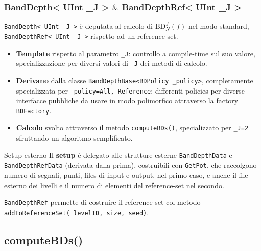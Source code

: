 \documentclass[9pt]{beamer}
\begin{document}
\begin{frame}
\frametitle{\ttfamily BandDepth< UInt \_J > $\&$ BandDepthRef< UInt \_J > }
\texttt{BandDepth< UInt \_J >} \`e deputata al calcolo di $\text{BD}^J_N(f)$ nel modo standard, \texttt{BandDepthRef< UInt \_J >} rispetto ad un reference-set.
\begin{itemize}
 \item \textbf{Template} rispetto al parametro \texttt{\_J}: controllo a compile-time sul suo valore, specializzazione per diversi valori di \texttt{\_J} dei metodi di calcolo.
 \item \textbf{Derivano} dalla classe \texttt{BandDepthBase<BDPolicy \_policy>}, completamente specializzata per \texttt{\_policy=\texttt{All}, \texttt{Reference}}: 
	   differenti policies per diverse interfacce pubbliche da usare in modo polimorfico attraverso la factory \texttt{BDFactory}. 
  \item \textbf{Calcolo} svolto attraverso il metodo \texttt{computeBDs()}, specializzato per \texttt{\_J=2} sfruttando un algoritmo semplificato.
\end{itemize}
\pause
\begin{block}{Setup esterno}
Il \textbf{setup} \`e delegato alle strutture esterne \texttt{BandDepthData} e \texttt{BandDepthRefData} (derivata dalla prima), costruibili con \texttt{GetPot}, 
che raccolgono numero di segnali, punti, files di input e output, nel primo caso, e anche  il file esterno dei livelli e il numero di elementi del reference-set nel secondo. 
\end{block}

\vskip 10pt
\texttt{BandDepthRef} permette di costruire il reference-set col metodo \texttt{addToReferenceSet( }\texttt{levelID, size, seed)}.
\end{frame}


\subsection{computeBDs()}
\end{document}
